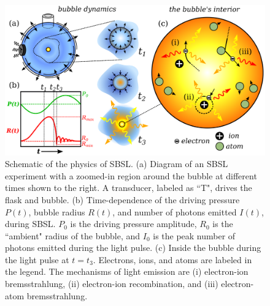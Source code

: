 \documentclass[11pt,prb,aps,nofootinbib,superscriptaddress,floatfix]{revtex4-2}
\begin{document}
\begin{figure}
\includegraphics[width=0.9\linewidth]{figs/summary_fig}
    \caption{Schematic of the physics of SBSL. (a) Diagram of an SBSL experiment with a zoomed-in region around the bubble at different times shown to the right. A transducer, labeled as ``T", drives the flask and bubble. (b) Time-dependence of the driving pressure $P(t)$, bubble radius $R(t)$, and number of photons emitted $I(t)$, during SBSL. $P_0$ is the driving pressure amplitude, $R_0$ is the ``ambient" radius of the bubble, and $I_0$ is the peak number of photons emitted during the light pulse. (c) Inside the bubble during the light pulse at $t=t_3$. Electrons, ions, and atoms are labeled in the legend. The mechanisms of light emission are (i) electron-ion bremsstrahlung, (ii) electron-ion recombination, and (iii) electron-atom bremsstrahlung. }
\label{fig:summary_fig}
\end{figure}
\end{document}
